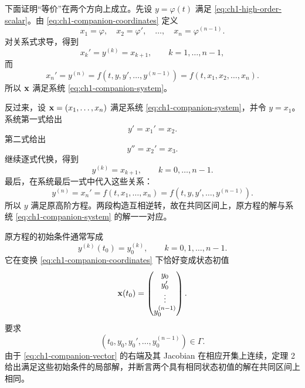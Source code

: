 下面证明“等价”在两个方向上成立。先设 \(y=\varphi(t)\) 满足 \eqref{eq:ch1-high-order-scalar}。由 \eqref{eq:ch1-companion-coordinates} 定义
\[
 x_1=\varphi,\quad x_2=\varphi',\quad\ldots,\quad x_n=\varphi^{(n-1)}.
\]
对关系式求导，得到
\begin{equation}
 x_k'=y^{(k)}=x_{k+1},
 \qquad k=1,\ldots,n-1,
 \label{eq:ch1-companion-first-equations}
\end{equation}
而
\begin{equation}
 x_n'=y^{(n)}
 =f(t,y,y',\ldots,y^{(n-1)})
 =f(t,x_1,x_2,\ldots,x_n).
 \label{eq:ch1-companion-last-equation}
\end{equation}
所以 \(\vect{x}\) 满足系统 \eqref{eq:ch1-companion-system}。

反过来，设 \(\vect{x}=(x_1,\ldots,x_n)\) 满足系统 \eqref{eq:ch1-companion-system}，并令 \(y=x_1\)。系统第一式给出
\[
 y'=x_1'=x_2.
\]
第二式给出
\[
 y''=x_2'=x_3.
\]
继续逐式代换，得到
\[
 y^{(k)}=x_{k+1},
 \qquad k=0,\ldots,n-1.
\]
最后，在系统最后一式中代入这些关系：
\[
 y^{(n)}=x_n'
 =f(t,x_1,\ldots,x_n)
 =f(t,y,y',\ldots,y^{(n-1)}).
\]
所以 \(y\) 满足原高阶方程。两段构造互相逆转，故在共同区间上，原方程的解与系统 \eqref{eq:ch1-companion-system} 的解一一对应。

原方程的初始条件通常写成
\begin{equation}
 y^{(k)}(t_0)=y_{0}^{(k)},
 \qquad k=0,1,\ldots,n-1.
 \label{eq:ch1-high-order-initial}
\end{equation}
它在变换 \eqref{eq:ch1-companion-coordinates} 下恰好变成状态初值
\begin{equation}
 \vect{x}(t_0)=
 \begin{pmatrix}
  y_0\\
  y_0'\\
  \vdots\\
  y_0^{(n-1)}
 \end{pmatrix}.
 \label{eq:ch1-state-initial}
\end{equation}
要求
\[
 (t_0,y_0,y_0',\ldots,y_0^{(n-1)})\in\Gamma.
\]
由于 \eqref{eq:ch1-companion-vector} 的右端及其 Jacobian 在相应开集上连续，定理 2 给出满足这些初始条件的局部解，并断言两个具有相同状态初值的解在共同区间上相同。

